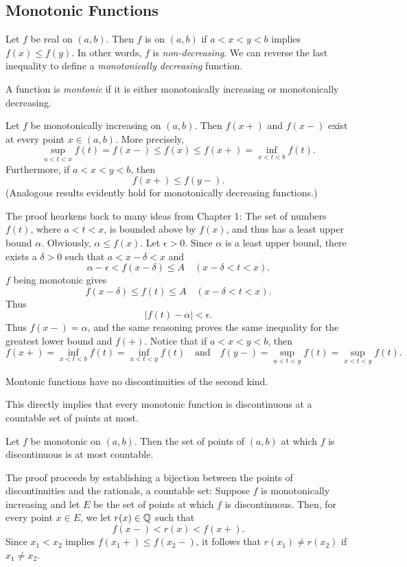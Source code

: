 \documentclass{article}
\begin{document}
\subsection{Monotonic Functions}
\begin{definition}
    Let $f$ be real on $(a,b)$. Then $f$ is  on $(a,b)$ if $a<x<y<b$ implies $f(x)\leq f(y).$ In other words, $f$ is \textit{non-decreasing}. We can reverse the last inequality to define a \textit{monotonically decreasing} function.
\end{definition}
\begin{remark}
    A function is \textit{montonic} if it is either monotonically increasing or monotonically decreasing.
\end{remark}
\begin{theorem}
    Let $f$ be monotonically increasing on $(a,b)$. Then $f(x+)$ and $f(x-)$ exist at every point $x\in(a,b)$. More precisely, 
    \[\sup_{a<t<x}f(t)=f(x-)\leq f(x)\leq f(x+)=\inf_{x<t<b}f(t).\]Furthermore, if $a<x<y<b$, then 
    \[f(x+)\leq f(y-).\](Analogous results evidently hold for monotonically decreasing functions.)
\end{theorem}
\begin{remark}
    The proof hearkens back to many ideas from Chapter 1: The set of numbers $f(t)$, where $a<t<x$, is bounded above by $f(x)$, and thus has a least upper bound $\alpha$. Obviously, $\alpha\leq f(x)$. Let $\epsilon>0$. Since $\alpha$ is a least upper bound, there exists a $\delta>0$ such that $a<x-\delta<x$ and \[\alpha-\epsilon<f(x-\delta)\leq A\quad(x-\delta<t<x).\]$f$ being monotonic gives \[f(x-\delta)\leq f(t)\leq A\quad(x-\delta<t<x).\]Thus \[|f(t)-\alpha|<\epsilon.\]Thus $f(x-)=\alpha$, and the same reasoning proves the same inequality for the greatest lower bound and $f(+)$. Notice that if $a<x<y<b$, then \[f(x+)=\inf_{x<t<b}f(t)=\inf_{x<t<y}f(t)\quad\textrm{and}\quad f(y-)=\sup_{a<t<y}f(t)=\sup_{x<t<y}f(t).\]
\end{remark}
\begin{corollary}
    Montonic functions have no discontinuities of the second kind.
\end{corollary}
This directly implies that every monotonic function is discontinuous at a countable set of points at most.
\begin{theorem}
    Let $f$ be monotonic on $(a,b)$. Then the set of points of $(a,b)$ at which $f$ is discontinuous is at most countable.
\end{theorem}
\begin{remark}
    The proof proceeds by establishing a bijection between the points of discontinuities and the rationals, a countable set: Suppose $f$ is monotonically increasing and let $E$ be the set of points at which $f$ is discontinuous. Then, for every point $x\in E$, we let $r(x)\in\mathbb Q$ such that\[f(x-)<r(x)<f(x+).\]Since $x_{1}<x_{2}$ implies $f(x_{1}+)\leq f(x_{2}-)$, it follows that $r(x_{1})\neq r(x_{2})$ if $x_{1}\neq x_{2}$.  
\end{remark}
\end{document}
